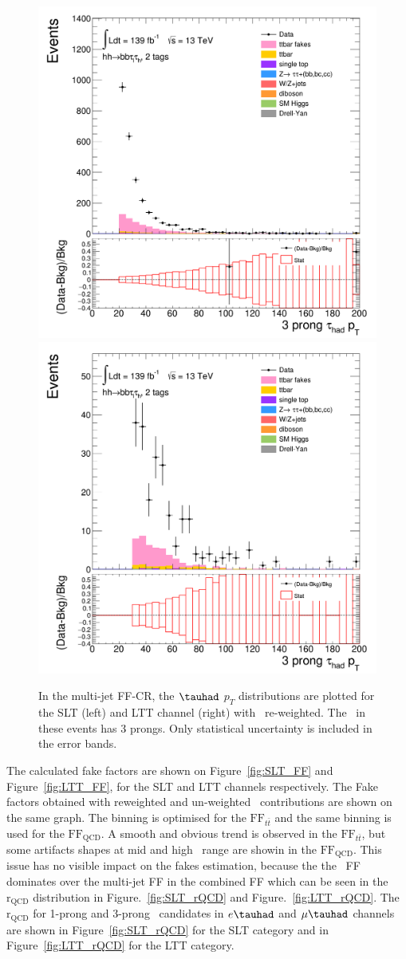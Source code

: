\begin{figure}[htbp]
\centering
\includegraphics[width=.48\textwidth]{DiHiggs/plots/FF_CRs/InvCR_SLT/HNone/BDTVarsHighMbb/2/C_2tag2pjet_0ptv_TauPt3P.png}
\includegraphics[width=.48\textwidth]{DiHiggs/plots/FF_CRs/InvCR_LTT/HNone/BDTVarsHighMbb/2/C_2tag2pjet_0ptv_TauPt3P.png}\\
\caption{In the multi-jet FF-CR, the $\tauhad$ $p_T$ distributions are plotted 
for the SLT (left) and LTT channel (right) 
with \ttbar\ re-weighted.
The \tauhad\ in these events has 3 prongs. 
Only statistical uncertainty is included in the error bands.}
\label{fig:InvCR_3}
\end{figure} 

\newpage
The calculated fake factors are shown on Figure~\ref{fig:SLT_FF} and Figure~\ref{fig:LTT_FF}, 
for the SLT and LTT channels respectively. 
The Fake factors obtained with reweighted and un-weighted \ttbar\ contributions are shown on the
same graph. 
The binning is optimised for the $\text{FF}_{t\bar{t}}$ and the same binning is used for the 
$\text{FF}_\text{QCD}$. A smooth and obvious trend is observed in the $\text{FF}_{t\bar{t}}$, 
but some artifacts shapes at mid and high \pt\ range are showin in the $\text{FF}_\text{QCD}$.
This issue has no visible impact on the fakes estimation, because the 
the \ttbar\ FF dominates over the multi-jet FF in the combined FF which can be seen 
in the $\mathrm{r}_\text{QCD}$ distribution in Figure.~\ref{fig:SLT_rQCD} and Figure.~\ref{fig:LTT_rQCD}. 
The  $\mathrm{r}_{\mathrm{QCD}}$ 
for 1-prong and 3-prong \tauhad\ candidates in $e\tauhad$ and $\mu\tauhad$ channels 
are shown in Figure~\ref{fig:SLT_rQCD} for the SLT category and 
in Figure~\ref{fig:LTT_rQCD} for the LTT category.



